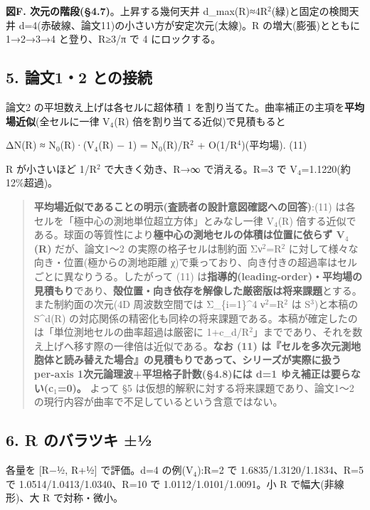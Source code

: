 \documentclass[
]{ltjsarticle}
\begin{document}
\textbf{図F. 次元の階段(§4.7)}。上昇する幾何天井
d\_max(R)≈4R\(^{2}\)(緑)と固定の検閲天井
d=4(赤破線、論文11)の小さい方が安定次元(太線)。R の増大(膨張)とともに
1→2→3→4 と登り、R≥3/π で 4 にロックする。

\subsection{5. 論文1・2
との接続}\label{ux8ad6ux658712-ux3068ux306eux63a5ux7d9a}

論文2 の平坦数え上げは各セルに超体積 1
を割り当てた。曲率補正の主項を\textbf{平均場近似}(全セルに一律
V\(_{4}\)(R) 倍を割り当てる近似)で見積もると

ΔN(R) ≈ N\(_{0}\)(R)·(V\(_{4}\)(R) − 1) = N\(_{0}\)(R)/R\(^{2}\) +
O(1/R\(^{4}\))(平均場). (11)

R が小さいほど 1/R\(^{2}\) で大きく効き、R→∞ で消える。R=3 で
V\(_{4}\)=1.1220(約12\%超過)。

\begin{quote}
\textbf{平均場近似であることの明示(査読者の設計意図確認への回答)}:(11)
は各セルを「極中心の測地単位超立方体」とみなし一律 V\(_{4}\)(R)
倍する近似である。球面の等質性により\textbf{極中心の測地セルの体積は位置に依らず
V\(_{4}\)(R)} だが、論文1〜2 の実際の格子セルは制約面
Σν\(^{2}\)=R\(^{2}\) に対して様々な向き・位置(極からの測地距離
χ)で乗っており、向き付きの超過率はセルごとに異なりうる。したがって (11)
は\textbf{指導的(leading-order)・平均場の見積もり}であり、\textbf{殻位置・向き依存を解像した厳密版は将来課題}とする。また制約面の次元(4D
周波数空間では Σ\_\{i=1\}\^{}4 ν\(^{2}\)=R\(^{2}\) は S\(^{3}\))と本稿の
S\^{}d(R)
の対応関係の精密化も同枠の将来課題である。本稿が確定したのは「単位測地セルの曲率超過は厳密に
1+c\_d/R\(^{2}\)」までであり、それを数え上げへ移す際の一律倍は近似である。\textbf{なお
(11)
は『セルを多次元測地胞体と読み替えた場合』の見積もりであって、シリーズが実際に扱う
per-axis 1次元論理波+平坦格子計数(§4.8)には d=1
ゆえ補正は要らない(c\(_{1}\)=0)。} よって §5
は仮想的解釈に対する将来課題であり、論文1〜2
の現行内容が曲率で不足しているという含意ではない。
\end{quote}

\subsection{6. R のバラツキ
±½}\label{r-ux306eux30d0ux30e9ux30c4ux30ad-uxbd}

各量を {[}R−½, R+½{]} で評価。d=4 の例(V\(_{4}\)):R=2 で
1.6835/1.3120/1.1834、R=5 で 1.0514/1.0413/1.0340、R=10 で
1.0112/1.0101/1.0091。小 R で幅大(非線形)、大 R で対称・微小。
\end{document}
